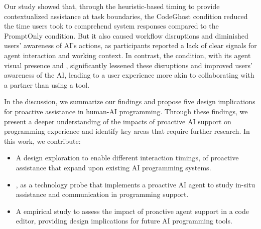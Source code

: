 Our study showed that, through the heuristic-based timing to provide contextualized assistance at task boundaries, the CodeGhost condition reduced the time users took to comprehend system responses compared to the PromptOnly condition.
But it also caused workflow disruptions and diminished users' awareness of AI's actions, as participants reported a lack of clear signals for agent interaction and working context. 
In contrast, the \sys{} condition, with its agent visual presence and , significantly lessened these disruptions and improved users' awareness of the AI, leading to a user experience more akin to collaborating with a partner than using a tool.

In the discussion, we summarize our findings and propose five design implications for proactive assistance in human-AI programming.
Through these findings, we present a deeper understanding of the impacts of proactive AI support on programming experience and identify key areas that require further research.
In this work, we contribute:
\begin{itemize}
    \item A design exploration to enable different interaction timings,  of proactive assistance that expand upon existing AI programming systems.
    \item \sys{}, as a technology probe that implements a proactive AI agent to study in-situ assistance and communication in programming support.
    \item A empirical study to assess the impact of proactive agent support in a code editor, providing design implications for future AI programming tools.
\end{itemize}

